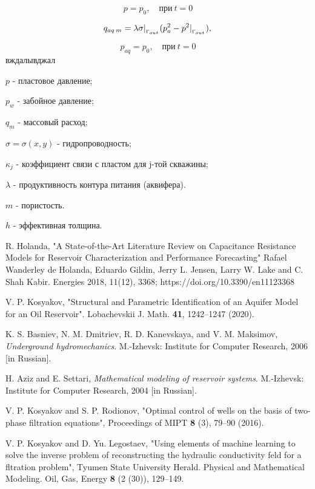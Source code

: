 \documentclass[14pt]{article}
\begin{document}
\begin{equation}
	p = p_0, \quad \mbox{при} {\:} t=0
\end{equation}

\begin{equation*}
	q_{aq \:m} = \lambda \sigma|_{_{\Gamma_{out}}} (p_{a}^2 - p^2|_{_{\Gamma_{out}}}), \\
\end{equation*}

\begin{equation*}
	p_{aq} = p_0, \quad \mbox{при} {\:} t=0
\end{equation*}
вждалывджал

	$p$ - пластовое давление;
	
	$p_w$ - забойное давление;
	
	$q_m$ - массовый расход;
	
	$\sigma = \sigma(x,y)$ - гидропроводность;
	
	$\kappa_j$ - коэффициент связи с пластом для j-той скважины;
	
	$\lambda$ - продуктивность контура питания (аквифера).
	
	$m$ - пористость.
	
	$h$ - эффективная толщина.
	
	
	\begin{thebibliography}{20}
		
		 R. Holanda, "A State-of-the-Art Literature Review on Capacitance
		Resistance Models for Reservoir Characterization
		and Performance Forecasting" Rafael Wanderley de Holanda, Eduardo Gildin, Jerry L. Jensen, Larry W. Lake and C. Shah Kabir. Energies 2018, 11(12), 3368; https://doi.org/10.3390/en11123368
		
		 V. P. Kosyakov, "Structural and Parametric Identification
		of an Aquifer Model for an Oil Reservoir". Lobachevskii J. Math.
		{\bf 41}, 1242--1247 (2020).
		
		 K. S. Basniev, N. M. Dmitriev, R. D. Kanevskaya, and V. M. Maksimov,
		\textit{Underground hydromechanics}. M.-Izhevsk: Institute for
		Computer Research, 2006 [in Russian].
		
		 H. Aziz and E. Settari, \textit{Mathematical modeling of reservoir systems}.
		M.-Izhevsk: Institute for Computer Research, 2004 [in Russian].
		
		 V. P. Kosyakov and S. P. Rodionov, "Optimal control of wells on the basis
		of two-phase filtration equations", Proceedings of MIPT {\bf 8} (3),
		79--90 (2016).
		
		 V. P. Kosyakov and  D. Yu. Legostaev, "Using elements of machine learning to
		solve the inverse problem of reconstructing the hydraulic 
		conductivity feld for a fltration problem", Tyumen State University
		Herald. Physical and Mathematical Modeling. Oil, Gas, Energy {\bf 8}
		(2 (30)), 129--149.
		
	\end{thebibliography}
	
\end{document}
